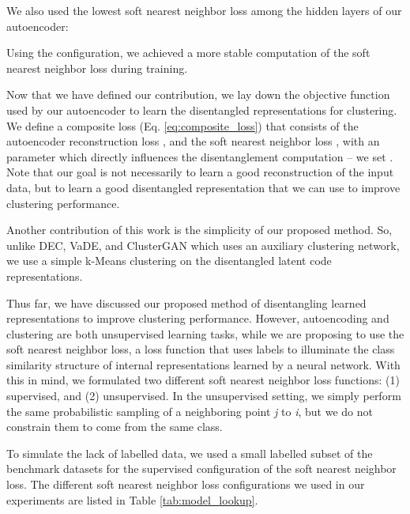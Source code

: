 \documentclass[conference]{IEEEtran}
\begin{document}
We also used the lowest soft nearest neighbor loss among the hidden layers of our autoencoder:

Using the  configuration, we achieved a more stable computation of the soft nearest neighbor loss during training.

Now that we have defined our contribution, we lay down the objective function used by our autoencoder to learn the disentangled representations for clustering. We define a composite loss (Eq. \ref{eq:composite_loss}) that consists of the autoencoder reconstruction loss , and the soft nearest neighbor loss , with an  parameter which directly influences the disentanglement computation -- we set . Note that our goal is not necessarily to learn a good reconstruction of the input data, but to learn a good disentangled representation that we can use to improve clustering performance.


Another contribution of this work is the simplicity of our proposed method. So, unlike DEC\cite{xie2016unsupervised}, VaDE\cite{jiang2016variational}, and ClusterGAN\cite{mukherjee2019clustergan} which uses an auxiliary clustering network, we use a simple k-Means clustering\cite{lloyd1982least} on the disentangled latent code representations.

Thus far, we have discussed our proposed method of disentangling learned representations to improve clustering performance. However, autoencoding and clustering are both unsupervised learning tasks, while we are proposing to use the soft nearest neighbor loss, a loss function that uses labels to illuminate the class similarity structure of internal representations learned by a neural network. With this in mind, we formulated two different soft nearest neighbor loss functions: (1) supervised, and (2) unsupervised. In the unsupervised setting, we simply perform the same probabilistic sampling of a neighboring point \textit{j} to \textit{i}, but we do not constrain them to come from the same class.

To simulate the lack of labelled data, we used a small labelled subset of the benchmark datasets for the supervised configuration of the soft nearest neighbor loss. The different soft nearest neighbor loss configurations we used in our experiments are listed in Table \ref{tab:model_lookup}.
\end{document}

